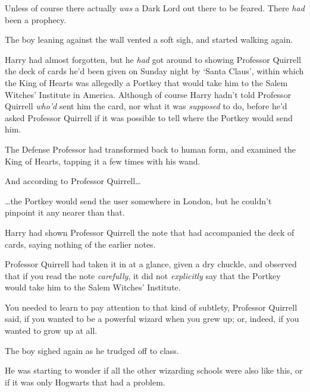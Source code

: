 Unless of course there actually \emph{was} a Dark Lord out there to be feared. There \emph{had} been a prophecy.

The boy leaning against the wall vented a soft sigh, and started walking again.

Harry had almost forgotten, but he \emph{had} got around to showing Professor Quirrell the deck of cards he'd been given on Sunday night by `Santa Claus', within which the King of Hearts was allegedly a Portkey that would take him to the Salem Witches' Institute in America. Although of course Harry hadn't told Professor Quirrell \emph{who'd} sent him the card, nor what it was \emph{supposed} to do, before he'd asked Professor Quirrell if it was possible to tell where the Portkey would send him.

The Defense Professor had transformed back to human form, and examined the King of Hearts, tapping it a few times with his wand.

And according to Professor Quirrell{\ldots}

{\ldots}the Portkey would send the user somewhere in London, but he couldn't pinpoint it any nearer than that.

Harry had shown Professor Quirrell the note that had accompanied the deck of cards, saying nothing of the earlier notes.

Professor Quirrell had taken it in at a glance, given a dry chuckle, and observed that if you read the note \emph{carefully}, it did not \emph{explicitly} say that the Portkey would take him to the Salem Witches' Institute.

You needed to learn to pay attention to that kind of subtlety, Professor Quirrell said, if you wanted to be a powerful wizard when you grew up; or, indeed, if you wanted to grow up at all.

The boy sighed again as he trudged off to class.

He was starting to wonder if all the other wizarding schools were also like this, or if it was only Hogwarts that had a problem.

